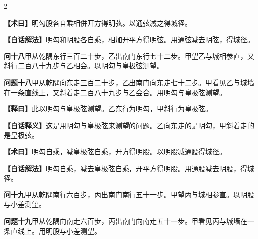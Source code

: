 \documentclass[11pt,a4paper]{article}
\newcommand{\WenQuestion}[1]{\textbf{\textcolor{classicalcolor}{#1}}}
\newcommand{\BaiQuestion}[1]{\textbf{\textcolor{moderncolor}{#1}}}
\newcommand{\WenExplain}{\textcolor{classicalcolor}{\textbf{【释曰】}}}
\newcommand{\BaiExplain}{\textcolor{moderncolor}{\textbf{【白话释义】}}}
\newcommand{\WenMethod}{\textcolor{classicalcolor}{\textbf{【术曰】}}}
\newcommand{\BaiMethod}{\textcolor{moderncolor}{\textbf{【白话解法】}}}
\begin{document}
\begin{paracol}{2}
\switchcolumn*
\begin{tcolorbox}[colback=red!5,colframe=red!40!black,boxrule=0.3pt]
\WenMethod\quad 明勾股各自乘相併开方得明弦。以通弦减之得城径。
\end{tcolorbox}
\switchcolumn
\begin{tcolorbox}[colback=blue!5,colframe=blue!40!black,boxrule=0.3pt]
\BaiMethod\quad 明勾和明股各自乘，相加开平方得明弦。用通弦减去明弦，得城径。
\end{tcolorbox}

\vspace{0.8em}

\switchcolumn*
\begin{tcolorbox}[colback=red!3,colframe=red!30!black,boxrule=0.3pt]
\WenQuestion{问十八}\quad 甲从乾隅东行三百二十步，乙出南门东行七十二步。甲望乙与城相参直，又斜行二百八十九步与乙相会。以明勾与皇极弦测望。
\end{tcolorbox}
\switchcolumn
\begin{tcolorbox}[colback=blue!3,colframe=blue!30!black,boxrule=0.3pt]
\BaiQuestion{问题十八}\quad 甲从乾隅向东走三百二十步，乙出南门向东走七十二步。甲看见乙与城墙在一条直线上，又斜着走二百八十九步与乙会合。用明勾与皇极弦测望。
\end{tcolorbox}

\switchcolumn*
\begin{tcolorbox}[colback=red!5,colframe=red!30!black,boxrule=0.3pt]
\WenExplain\quad 此以明勾与皇极弦测望。乙东行为明勾，甲斜行为皇极弦。
\end{tcolorbox}
\switchcolumn
\begin{tcolorbox}[colback=blue!5,colframe=blue!30!black,boxrule=0.3pt]
\BaiExplain\quad 这是用明勾与皇极弦来测望的问题。乙向东走的是明勾，甲斜着走的是皇极弦。
\end{tcolorbox}

\switchcolumn*
\begin{tcolorbox}[colback=red!5,colframe=red!40!black,boxrule=0.3pt]
\WenMethod\quad 明勾自乘，减皇极弦自乘，开方得明股。以明股减通股得城径。
\end{tcolorbox}
\switchcolumn
\begin{tcolorbox}[colback=blue!5,colframe=blue!40!black,boxrule=0.3pt]
\BaiMethod\quad 明勾自乘，减去皇极弦自乘，开平方得明股。用通股减去明股，得城径。
\end{tcolorbox}

\vspace{0.8em}

\switchcolumn*
\begin{tcolorbox}[colback=red!3,colframe=red!30!black,boxrule=0.3pt]
\WenQuestion{问十九}\quad 甲从乾隅南行六百步，丙出南门南行五十一步。甲望丙与城相参直。以明股与小差测望。
\end{tcolorbox}
\switchcolumn
\begin{tcolorbox}[colback=blue!3,colframe=blue!30!black,boxrule=0.3pt]
\BaiQuestion{问题十九}\quad 甲从乾隅向南走六百步，丙出南门向南走五十一步。甲看见丙与城墙在一条直线上。用明股与小差测望。
\end{tcolorbox}


\end{paracol}
\end{document}
